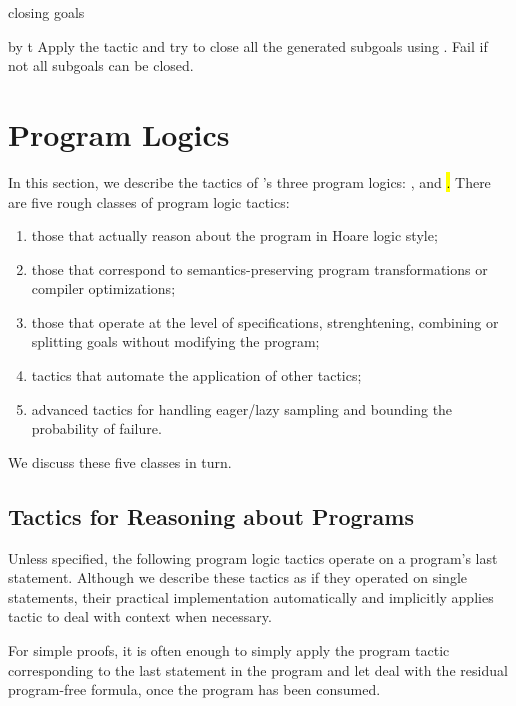 \begin{tactic}[by t]{closing goals}
  \begin{tsyntax}[empty]{by t}
  Apply the tactic  and try to close all the generated subgoals using
  . Fail if not all subgoals can be closed.
  \end{tsyntax}
\end{tactic}

\section{Program Logics}
\label{sec:programlogics}

In this section, we describe the tactics of \EasyCrypt's three program
logics: \prhl, \phl and \hl.  There are five rough classes of program
logic tactics:
\begin{enumerate}
\item those that actually reason about the program in Hoare logic
  style;

\item those that correspond to semantics-preserving program
  transformations or compiler optimizations;

\item those that operate at the level of specifications,
  strenghtening, combining or splitting goals without modifying the
  program;

\item tactics that automate the application of other tactics;

\item advanced tactics for handling eager/lazy sampling and bounding
  the probability of failure.
\end{enumerate}
We discuss these five classes in turn.

\subsection{Tactics for Reasoning about Programs}
\label{subsec:reasoningprograms}

Unless specified, the following program logic tactics operate on a
program's last statement. Although we describe these tactics as if
they operated on single statements, their practical implementation
automatically and implicitly applies tactic  to deal with
context when necessary.

For simple proofs, it is often enough to simply apply the program
tactic corresponding to the last statement in the program and let
 deal with the residual program-free formula, once the program
has been consumed.

